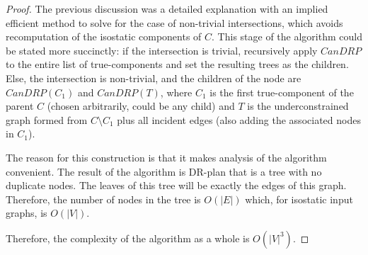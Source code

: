 \begin{proof}
The previous discussion was a detailed explanation with an implied efficient method to solve for the case of non-trivial intersections, which avoids recomputation of the isostatic components of $C$. This stage of the algorithm could be stated more succinctly:
if the intersection is trivial, recursively apply $CanDRP$ to the entire list of true-components and set the resulting trees as the children. Else, the intersection is non-trivial, and the children of the node are $CanDRP(C_1)$ and $CanDRP(T)$, where $C_1$ is the first true-component of the parent $C$ (chosen arbitrarily, could be any child) and $T$ is the underconstrained graph formed from $C\setminus C_1$ plus all incident edges (also adding the associated nodes in $C_1$).


The reason for this construction is that it makes analysis of the algorithm convenient. The result of the algorithm is DR-plan that is a tree with no duplicate nodes. The leaves of this tree will be exactly the edges of this graph. Therefore, the number of nodes in the tree is $O(|E|)$ which, for isostatic input graphs, is $O(|V|)$.

Therefore, the complexity of the algorithm as a whole is $O(|V|^3)$.
%
\end{proof}




